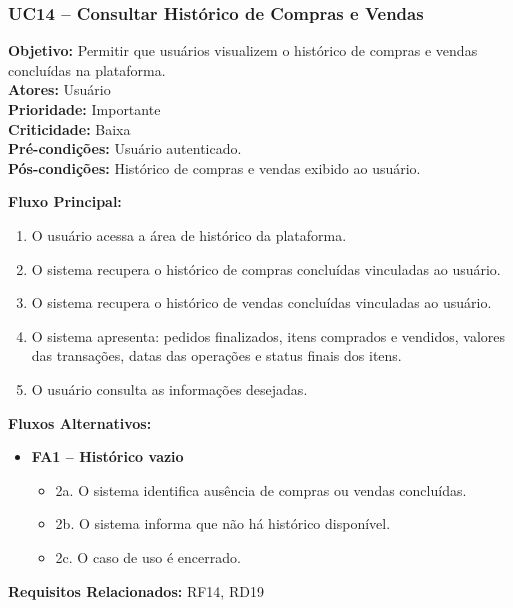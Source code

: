 \documentclass[
	article,			%
	11pt,				%
	oneside,			%
	a4paper,			%
	english,			%
	brazil,				%
	sumario=tradicional
	]{abntex2}
\begin{document}

\subsubsection{UC14 – Consultar Histórico de Compras e Vendas}
\label{uc:14}
\noindent\textbf{Objetivo:} Permitir que usuários visualizem o histórico de compras e vendas concluídas na plataforma.\\
\textbf{Atores:} Usuário\\
\textbf{Prioridade:} Importante\\
\textbf{Criticidade:} Baixa\\
\textbf{Pré-condições:} Usuário autenticado.\\
\textbf{Pós-condições:} Histórico de compras e vendas exibido ao usuário.

\vspace{0.5em}
\noindent\textbf{Fluxo Principal:}
\begin{enumerate}[label=\arabic*.]
    \item O usuário acessa a área de histórico da plataforma.
    \item O sistema recupera o histórico de compras concluídas vinculadas ao usuário.
    \item O sistema recupera o histórico de vendas concluídas vinculadas ao usuário.
    \item O sistema apresenta: pedidos finalizados, itens comprados e vendidos, valores das transações, datas das operações e status finais dos itens.
    \item O usuário consulta as informações desejadas.
\end{enumerate}

\vspace{0.5em}
\noindent\textbf{Fluxos Alternativos:}
\begin{itemize}[leftmargin=*]
    \item \textbf{FA1 – Histórico vazio}
    \begin{itemize}[label={}, leftmargin=0.5cm]
        \item 2a. O sistema identifica ausência de compras ou vendas concluídas.
        \item 2b. O sistema informa que não há histórico disponível.
        \item 2c. O caso de uso é encerrado.
    \end{itemize}
\end{itemize}

\vspace{0.5em}
\noindent\textbf{Requisitos Relacionados:} RF14, RD19
\end{document}
